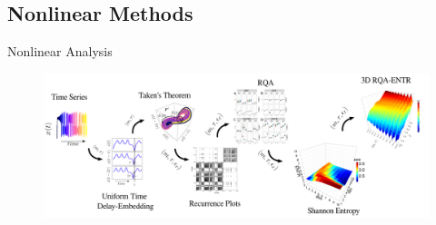 \subsection{Nonlinear Methods}

{
\begin{frame}{Nonlinear Analysis}
    \vspace{-00mm}
      \begin{figure}
        \centering
        \includegraphics[width=0.99\linewidth]{./figs/nonlinear-methods/versions/drawing-v00.png}
        \caption{}
      \end{figure}
\end{frame}
}
